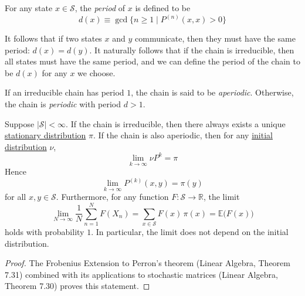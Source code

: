   \begin{definition}[Period]
    \label{def:period}
    For any state $x \in \mathcal{S}$, the \textit{period} of $x$ is defined to be
    \begin{equation}
      d(x) \equiv \gcd \{n \geq 1 \; | \; P^{(n)} (x, x) > 0\}
    \end{equation}
  \end{definition}

  \begin{theorem}
    \label{thm:communicating-states-share-a-period}
    It follows that if two states $x$ and $y$ communicate, then they must have the same period: $d(x) = d(y)$. It naturally follows that if the chain is irreducible, then all states must have the same period, and we can define the period of the chain to be $d(x)$ for any $x$ we choose.
  \end{theorem}

  \begin{definition}
    \label{def:aperiodic-chain}
    If an irreducible chain has period $1$, the chain is said to be \textit{aperiodic}. Otherwise, the chain is \textit{periodic} with period $d > 1$. 
  \end{definition}

  \begin{theorem}
    \label{thm:unique-stationary-distribution-for-a-finite}
    Suppose $|\mathcal{S}| < \infty$. If the chain is irreducible, then there always exists a unique \hyperref[def:stationary-distribution]{stationary distribution} $\pi$. If the chain is also aperiodic, then for any \hyperref[def:initial-distribution]{initial distribution} $\nu$, 
    \begin{equation}
      \lim_{k \rightarrow \infty} \nu P^k = \pi
    \end{equation}
    Hence
    \begin{equation}
      \lim_{k \rightarrow \infty} P^{(k)}(x, y) = \pi(y)
    \end{equation}
    for all $x, y \in \mathcal{S}$. Furthermore, for any function $F: \mathcal{S} \to \mathbb{R}$, the limit
    \begin{equation}
      \lim_{N \rightarrow \infty} \frac{1}{N} \sum_{n=1}^N F(X_n) = \sum_{x \in \mathcal{S}} F(x)\, \pi(x) = \mathbb{E} \big( F(x) \big)
    \end{equation}
    holds with probability $1$. In particular, the limit does not depend on the initial distribution. 
  \end{theorem}
  \begin{proof}
    The Frobenius Extension to Perron's theorem (Linear Algebra, Theorem 7.31) combined with its applications to stochastic matrices (Linear Algebra, Theorem 7.30) proves this statement. 
  \end{proof}

